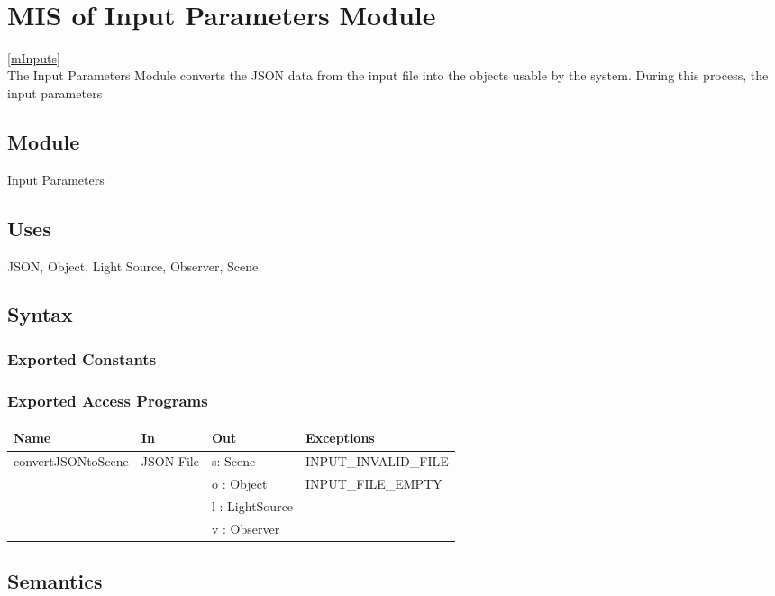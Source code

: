 \documentclass[12pt, titlepage]{article}
\begin{document}
~\newpage



\section{MIS of Input Parameters Module} \ref{mInputs} \\
The Input Parameters Module converts the JSON data from the input file into the 
objects usable by the system. During this process, the input parameters 

\subsection{Module}
Input Parameters

\subsection{Uses}
JSON, Object, Light Source, Observer, Scene

\subsection{Syntax}
\subsubsection{Exported Constants}

\subsubsection{Exported Access Programs}
\begin{center}
	\begin{tabular}{p{4cm} p{2cm} p{2cm} p{4cm}}
		\hline
		\textbf{Name} & \textbf{In} & \textbf{Out} & \textbf{Exceptions} \\
		\hline
		\multirow{4}{*}{convertJSONtoScene} & \multirow{4}{2cm}{JSON File} & s: 
		Scene & INPUT\_INVALID\_FILE\\
		& & o : Object & INPUT\_FILE\_EMPTY\\
		& & l : LightSource & \\
		& & v : Observer & \\
		\hline
	\end{tabular}
\end{center}

\subsection{Semantics}
\end{document}
